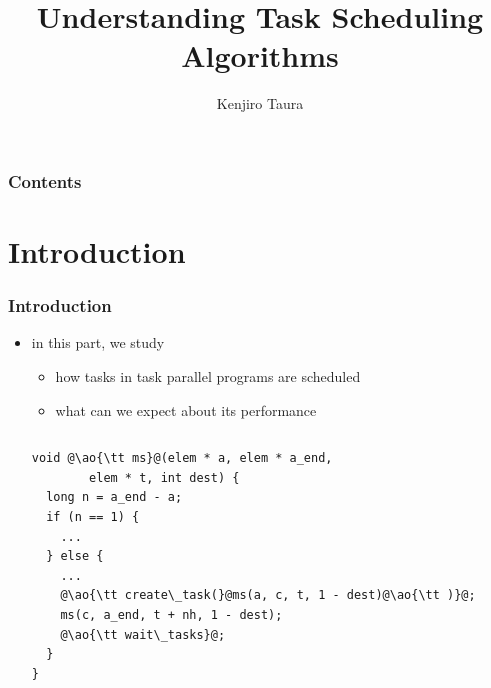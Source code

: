 \documentclass[12pt,dvipdfmx]{beamer}
\title{Understanding Task Scheduling Algorithms}
\institute{}
\author{Kenjiro Taura}
\date{}
\newcommand{\ao}[1]{{\color{blue}#1}}
\begin{document}
\maketitle

\begin{frame}
\frametitle{Contents}
\tableofcontents
\end{frame}



\section{Introduction}

\begin{frame}[fragile]
\frametitle{Introduction}
\begin{itemize}
\item in this part, we study 
  \begin{itemize}
  \item how tasks in task parallel programs are scheduled
  \item what can we expect about its performance
  \end{itemize}
\begin{columns}
\begin{column}{0.5\textwidth}
\begin{lstlisting}
void @\ao{\tt ms}@(elem * a, elem * a_end, 
        elem * t, int dest) {
  long n = a_end - a;
  if (n == 1) {
    ...
  } else {
    ...
    @\ao{\tt create\_task(}@ms(a, c, t, 1 - dest)@\ao{\tt )}@;
    ms(c, a_end, t + nh, 1 - dest);
    @\ao{\tt wait\_tasks}@;
  }
}
\end{lstlisting}
\end{column}
\begin{column}{0.5\textwidth}
\begin{center}
\end{center}
\end{column}
\end{columns}
\end{itemize}
\end{frame}
\end{document}
